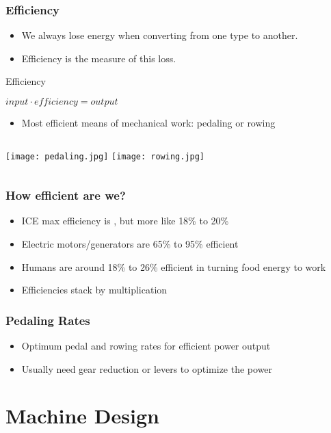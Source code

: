 \documentclass[]{beamer}
\begin{document}
{
    \frametitle{Efficiency}
    \begin{itemize}
        \item<1-> We always lose energy when converting from one type to another.
        \item<2-> Efficiency is the measure of this loss.
    \end{itemize}
	\begin{beamerboxesrounded}[upper=uppercol,lower=lowercol,shadow=true]{Efficiency}
        \begin{center}
            $input\cdot efficiency=output$
        \end{center}
    \end{beamerboxesrounded}
    \begin{itemize}
        \item Most efficient means of mechanical work: pedaling or rowing
    \end{itemize}
    \begin{columns}[t]
        \column{5.5cm}
        \texttt{[image: pedaling.jpg]}
        \column{5.5cm}
        \texttt{[image: rowing.jpg]}
    \end{columns}
}
\frame
{
    \frametitle{How efficient are we?}
    \begin{itemize}[<+->]
        \item ICE max efficiency is , but more like \alert{18\% to 20\%}
        \item Electric motors/generators are \alert{65\% to 95\%} efficient
        \item Humans are around \alert{18\% to 26\%} efficient in turning food energy to work
        \item Efficiencies stack by multiplication
    \end{itemize}
}
\frame
{
    \frametitle{Pedaling Rates}
    \begin{itemize}
        \item Optimum pedal and rowing rates for efficient power output
        \item Usually need gear reduction or levers to optimize the power
    \end{itemize}
}
\section{Machine Design}
\end{document}
